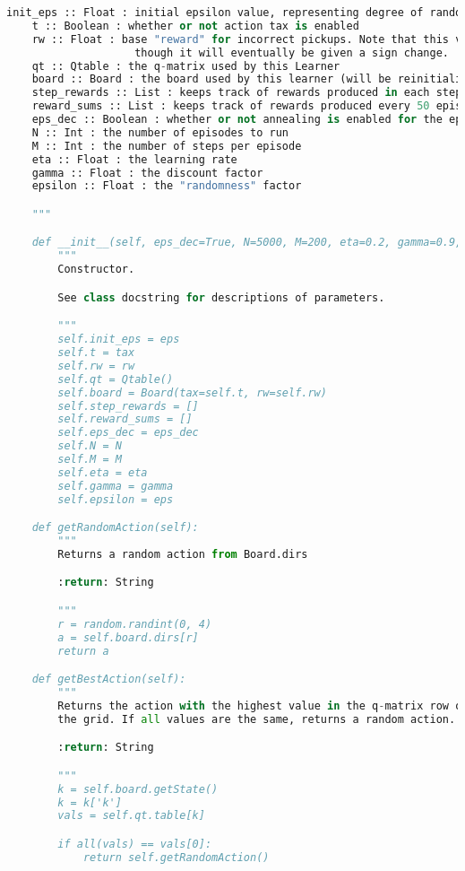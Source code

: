 \documentclass[12pt,a4paper]{article}
\begin{document}
\begin{lstlisting}[language=Python,numbers=none,basicstyle=\tiny]
    init_eps :: Float : initial epsilon value, representing degree of randomness in actions taken
    t :: Boolean : whether or not action tax is enabled
    rw :: Float : base "reward" for incorrect pickups. Note that this value should be positive, even
                    though it will eventually be given a sign change.
    qt :: Qtable : the q-matrix used by this Learner
    board :: Board : the board used by this learner (will be reinitialized between episodes)
    step_rewards :: List : keeps track of rewards produced in each step. reinitialized often
    reward_sums :: List : keeps track of rewards produced every 50 episodes
    eps_dec :: Boolean : whether or not annealing is enabled for the epsilon value
    N :: Int : the number of episodes to run
    M :: Int : the number of steps per episode
    eta :: Float : the learning rate
    gamma :: Float : the discount factor
    epsilon :: Float : the "randomness" factor

    """

    def __init__(self, eps_dec=True, N=5000, M=200, eta=0.2, gamma=0.9, eps=1.0, tax=False, rw=1.0):
        """
        Constructor.

        See class docstring for descriptions of parameters.

        """
        self.init_eps = eps
        self.t = tax
        self.rw = rw
        self.qt = Qtable()
        self.board = Board(tax=self.t, rw=self.rw)
        self.step_rewards = []
        self.reward_sums = []
        self.eps_dec = eps_dec
        self.N = N
        self.M = M
        self.eta = eta
        self.gamma = gamma
        self.epsilon = eps

    def getRandomAction(self):
        """
        Returns a random action from Board.dirs

        :return: String

        """
        r = random.randint(0, 4)
        a = self.board.dirs[r]
        return a

    def getBestAction(self):
        """
        Returns the action with the highest value in the q-matrix row of the current state of
        the grid. If all values are the same, returns a random action.

        :return: String

        """
        k = self.board.getState()
        k = k['k']
        vals = self.qt.table[k]

        if all(vals) == vals[0]:
            return self.getRandomAction()


\end{lstlisting}
\end{document}
